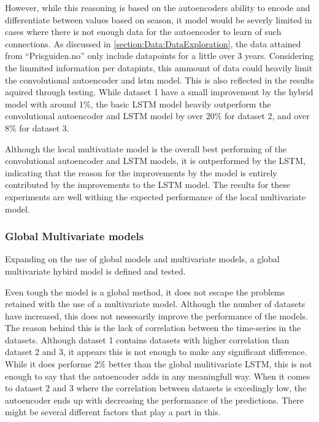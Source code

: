 However, while this reasoning is based on the autoencoders ability to encode and differentiate between values based on season,
it model would be severly limited in cases where there is not enough data for the autoencoder to learn of such connections.
As discussed in \cref{section:Data:DataExploration}, the data attained from ``Prisguiden.no'' only include datapoints
for a little over 3 years.
Considering the limmited information per datapints, this ammount of data could heavily limit the convolutional autoencoder and lstm model.
This is also reflected in the results aquired through testing.
While dataset 1 have a small improvement by the hybrid model with around 1\%,
the basic LSTM model heavily outperform the convolutional autoencoder and LSTM model by over 20\% for dataset 2, and over 8\% for dataset 3.

Although the local multivatiate model is the overall best performing of the convolutional autoencoder and LSTM models,
it is outperformed by the LSTM, indicating that the reason for the improvements by the model
is entirely contributed by the improvements to the LSTM model.
The results for these experiments are well withing the expected performance of the local multivariate model.





\subsubsection{Global Multivariate models}

Expanding on the use of global models and multivariate models,
a global multivariate hybird model is defined and tested.

Even tough the model is a global method, it does not escape the problems retained with the use of a multivariate model.
Although the number of datasets have increased, this does not nessesarily improve the performance of the models.
The reason behind this is the lack of correlation between the time-series in the datasets.
Although dataset 1 contains datasets with higher correlation than dataset 2 and 3, it appears this is not enough to make any significant difference.
While it does performe 2\% better than the global mulitivariate LSTM, this is not enough to say that the autoencoder adds
in any meaningfull way.
When it comes to dataset 2 and 3 where the correlation between datasets is excedingly low, the autoencoder ends up with decreasing the performance of the predictions.
There might be several different factors that play a part in this.


